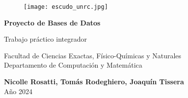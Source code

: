 \documentclass[12pt]{article}
\begin{document}
\begin{titlepage}
    \centering
    \begin{figure}
        \centering
        \texttt{[image: escudo\_unrc.jpg]}
    \end{figure}
    \vfill
    
    \huge
    \textbf{Proyecto de Bases de Datos}
    \vspace{0.5cm}
    
    \LARGE
    Trabajo práctico integrador
    \vspace{1cm}

    \Large
    Facultad de Ciencias Exactas, Físico-Químicas y Naturales\\
    Departamento de Computación y Matemática\\
    \vspace{0.5cm}
    
    \vfill
    \Large
    \textbf{Nicolle Rosatti, Tomás Rodeghiero, Joaquín Tissera}\\
    \vspace{0.25cm}
    Año 2024
    \vspace{1.5cm}
\end{titlepage}
\end{document}
